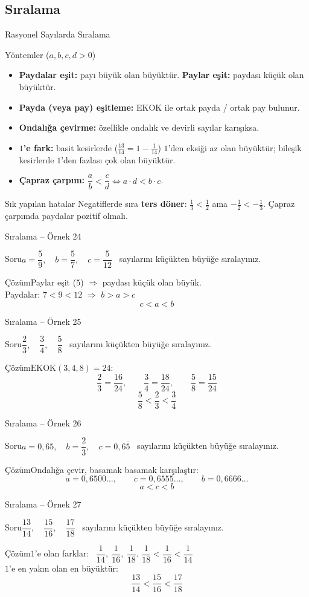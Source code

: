 \documentclass[aspectratio=169,11pt,handout]{beamer}
\newcommand{\soru}[3]{%
\begin{frame}{#1}
  \begin{block}{Soru}\large #2\end{block}
  \pause
  \begin{exampleblock}{Çözüm}\large #3\end{exampleblock}
\end{frame}}
\newcommand{\ab}[1]{\overline{#1}}
\begin{document}
\subsection{Sıralama}
\begin{frame}{Rasyonel Sayılarda Sıralama}
\begin{block}{Yöntemler (\(a,b,c,d>0\))}
\begin{itemize}
\item \textbf{Paydalar eşit:} payı büyük olan büyüktür. \quad \textbf{Paylar eşit:} paydası küçük olan büyüktür.
\item \textbf{Payda (veya pay) eşitleme:} EKOK ile ortak payda / ortak pay bulunur.
\item \textbf{Ondalığa çevirme:} özellikle ondalık ve devirli sayılar karışıksa.
\item \textbf{\(1\)'e fark:} basit kesirlerde (\(\frac{13}{14}=1-\frac{1}{14}\)) \(1\)'den eksiği az olan büyüktür; bileşik kesirlerde \(1\)'den fazlası çok olan büyüktür.
\item \textbf{Çapraz çarpım:} \(\dfrac{a}{b}<\dfrac{c}{d}\iff a\cdot d<b\cdot c\).
\end{itemize}
\end{block}
\begin{alertblock}{Sık yapılan hatalar}
Negatiflerde sıra \textbf{ters döner}: \(\frac{1}{3}<\frac{1}{2}\) ama \(-\frac{1}{2}<-\frac{1}{3}\). \quad Çapraz çarpımda paydalar pozitif olmalı.
\end{alertblock}
\end{frame}

\soru{Sıralama -- Örnek 24}
{\(a=\dfrac{5}{9},\quad b=\dfrac{5}{7},\quad c=\dfrac{5}{12}\) \ sayılarını küçükten büyüğe sıralayınız.}
{Paylar eşit (\(5\)) \(\Rightarrow\) paydası küçük olan büyük.\\[3pt]
Paydalar: \(7<9<12\) \(\Rightarrow\) \(b>a>c\)
\[c<a<b\]}

\soru{Sıralama -- Örnek 25}
{\(\dfrac{2}{3},\quad \dfrac{3}{4},\quad \dfrac{5}{8}\) \ sayılarını küçükten büyüğe sıralayınız.}
{\(\text{EKOK}(3,4,8)=24\):
\[\frac{2}{3}=\frac{16}{24},\qquad \frac{3}{4}=\frac{18}{24},\qquad \frac{5}{8}=\frac{15}{24}\]
\[\frac{5}{8}<\frac{2}{3}<\frac{3}{4}\]}

\soru{Sıralama -- Örnek 26}
{\(a=0{,}65,\quad b=\dfrac{2}{3},\quad c=0{,}6\ab{5}\) \ sayılarını küçükten büyüğe sıralayınız.}
{Ondalığa çevir, basamak basamak karşılaştır:
\[a=0{,}6500\ldots,\qquad c=0{,}6555\ldots,\qquad b=0{,}6666\ldots\]
\[a<c<b\]}

\soru{Sıralama -- Örnek 27}
{\(\dfrac{13}{14},\quad \dfrac{15}{16},\quad \dfrac{17}{18}\) \ sayılarını küçükten büyüğe sıralayınız.}
{\(1\)'e olan farklar: \ \(\dfrac{1}{14},\ \dfrac{1}{16},\ \dfrac{1}{18}\). \quad \(\dfrac{1}{18}<\dfrac{1}{16}<\dfrac{1}{14}\)\\[3pt]
\(1\)'e en yakın olan en büyüktür:
\[\frac{13}{14}<\frac{15}{16}<\frac{17}{18}\]}
\end{document}
